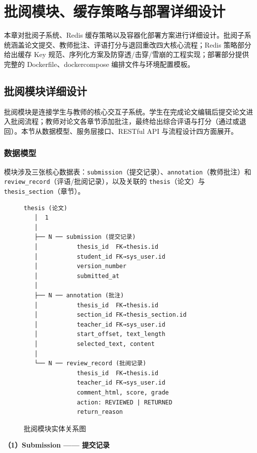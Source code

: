 \documentclass{../../softeng}
\begin{document}
\section{批阅模块、缓存策略与部署详细设计}

本章对批阅子系统、Redis 缓存策略以及容器化部署方案进行详细设计。批阅子系统涵盖论文提交、教师批注、评语打分与退回重改四大核心流程；Redis 策略部分给出缓存 Key 规范、序列化方案及防穿透/击穿/雪崩的工程实现；部署部分提供完整的 Dockerfile、docker\-compose 编排文件与环境配置模板。

\subsection{批阅模块详细设计}

批阅模块是连接学生与教师的核心交互子系统。学生在完成论文编辑后提交论文进入批阅流程；教师对论文各章节添加批注，最终给出综合评语与打分（通过或退回）。本节从数据模型、服务层接口、RESTful API 与流程设计四方面展开。

\subsubsection{数据模型}

模块涉及三张核心数据表：\texttt{submission}（提交记录）、\texttt{annotation}（教师批注）和 \texttt{review\_record}（评语/批阅记录），以及关联的 \texttt{thesis}（论文）与 \texttt{thesis\_section}（章节）。

\begin{figure}[htbp]
\centering
\begin{verbatim}
thesis (论文)
   │  1
   │
   ├── N ── submission (提交记录)
   │           thesis_id  FK→thesis.id
   │           student_id FK→sys_user.id
   │           version_number
   │           submitted_at
   │
   ├── N ── annotation (批注)
   │           thesis_id  FK→thesis.id
   │           section_id FK→thesis_section.id
   │           teacher_id FK→sys_user.id
   │           start_offset, text_length
   │           selected_text, content
   │
   └── N ── review_record (批阅记录)
               thesis_id  FK→thesis.id
               teacher_id FK→sys_user.id
               comment_html, score, grade
               action: REVIEWED | RETURNED
               return_reason
\end{verbatim}
\caption{批阅模块实体关系图}
\label{fig:review-er}
\end{figure}

\textbf{（1）Submission —— 提交记录}
\end{document}

